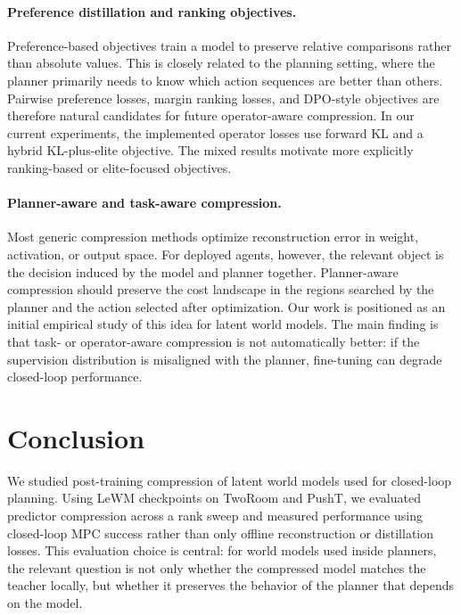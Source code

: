 \documentclass[11pt]{article}
\begin{document}
\paragraph{Preference distillation and ranking objectives.}
Preference-based objectives train a model to preserve relative comparisons rather than absolute values. This is closely related to the planning setting, where the planner primarily needs to know which action sequences are better than others. Pairwise preference losses, margin ranking losses, and DPO-style objectives are therefore natural candidates for future operator-aware compression. In our current experiments, the implemented operator losses use forward KL and a hybrid KL-plus-elite objective. The mixed results motivate more explicitly ranking-based or elite-focused objectives.

\paragraph{Planner-aware and task-aware compression.}
Most generic compression methods optimize reconstruction error in weight, activation, or output space. For deployed agents, however, the relevant object is the decision induced by the model and planner together. Planner-aware compression should preserve the cost landscape in the regions searched by the planner and the action selected after optimization. Our work is positioned as an initial empirical study of this idea for latent world models. The main finding is that task- or operator-aware compression is not automatically better: if the supervision distribution is misaligned with the planner, fine-tuning can degrade closed-loop performance.

\section{Conclusion}
\label{sec:conclusion}

We studied post-training compression of latent world models used for closed-loop planning. Using LeWM checkpoints on TwoRoom and PushT, we evaluated predictor compression across a rank sweep and measured performance using closed-loop MPC success rather than only offline reconstruction or distillation losses. This evaluation choice is central: for world models used inside planners, the relevant question is not only whether the compressed model matches the teacher locally, but whether it preserves the behavior of the planner that depends on the model.
\end{document}
